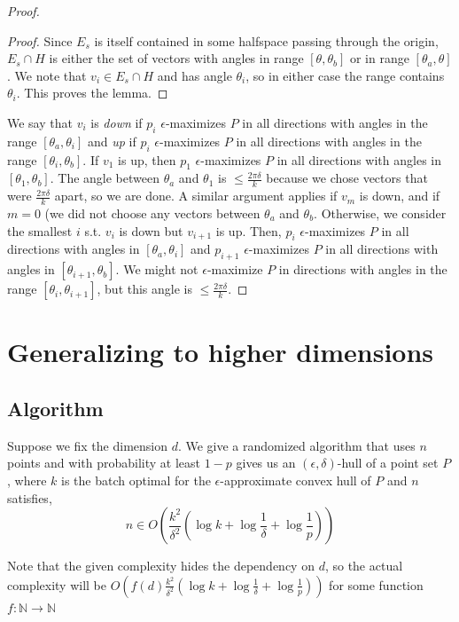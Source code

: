 \begin{proof}
\begin{proof}
Since $E_s$ is itself contained in some halfspace passing through the origin, $E_s \cap H$ is either the set of vectors with angles in range $[\theta, \theta_b]$ or in range $[\theta_a, \theta]$. We note that $v_i \in E_s \cap H$ and has angle $\theta_i$, so in either case the range contains $\theta_i$. This proves the lemma.
\end{proof}

We say that $v_i$ is \emph{down} if $p_i$ $\epsilon$-maximizes $P$ in all directions with angles in the range $[\theta_a, \theta_i]$ and \emph{up} if $p_i$ $\epsilon$-maximizes $P$ in all directions with angles in the range $[\theta_i, \theta_b]$. If $v_1$ is up, then $p_1$ $\epsilon$-maximizes $P$ in all directions with angles in $[\theta_1, \theta_b]$. The angle between $\theta_a$ and $\theta_1$ is $\leq \frac{2\pi\delta}{k}$ because we chose vectors that were $\frac{2\pi\delta}{k}$ apart, so we are done. A similar argument applies if $v_m$ is down, and if $m = 0$ (we did not choose any vectors between $\theta_a$ and $\theta_b$. Otherwise, we consider the smallest $i$ s.t. $v_i$ is down but $v_{i+1}$ is up. Then, $p_i$ $\epsilon$-maximizes $P$ in all directions with angles in $[\theta_a, \theta_i]$ and $p_{i+1}$ $\epsilon$-maximizes $P$ in all directions with angles in $[\theta_{i+1}, \theta_b]$. We might not $\epsilon$-maximize $P$ in directions with angles in the range $[\theta_i, \theta_{i+1}]$, but this angle is $\leq \frac{2\pi\delta}{k}$.
\end{proof}


\section{Generalizing to higher dimensions}

\subsection{Algorithm}

Suppose we fix the dimension $d$. We give a randomized algorithm that uses $n$ points and with probability at least $1-p$ gives us an $(\epsilon, \delta)$-hull of a point set $P$, where $k$ is the batch optimal for the $\epsilon$-approximate convex hull of $P$ and $n$ satisfies,
\[ n \in O\left(\frac{k^2}{\delta^2}\left(\log{k} + \log{\frac{1}{\delta} + \log{\frac{1}{p}} }\right)\right) \]

Note that the given complexity hides the dependency on $d$, so the actual complexity will be $O(f(d) \frac{k^2}{\delta^2}\left(\log{k} + \log{\frac{1}{\delta} + \log{\frac{1}{p}} }\right))$ for some function $f : \mathbb{N} \to \mathbb{N}$
\\

